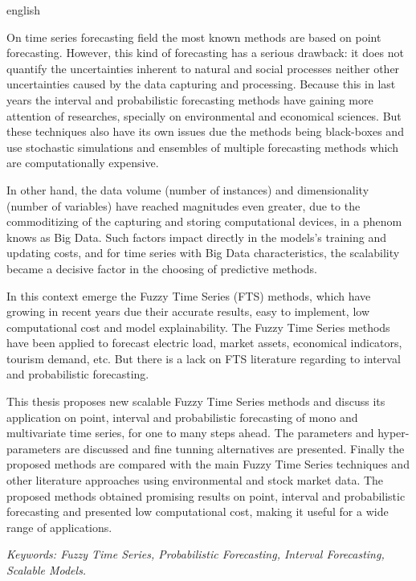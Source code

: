\begin{resumo}[Abstract]
    \begin{otherlanguage*}{english}

On time series forecasting field the most known methods are based on point forecasting. However, this kind of forecasting has a serious drawback: it does not quantify the uncertainties inherent to natural and social processes neither other uncertainties caused by the data capturing and processing. Because this in last years the interval and probabilistic forecasting methods have gaining more attention of researches, specially on environmental and economical sciences. But these techniques also have its own issues due the methods being black-boxes and use stochastic simulations and ensembles of multiple forecasting methods which are computationally expensive.

In other hand, the data volume (number of instances) and dimensionality (number of variables) have reached magnitudes even greater, due to the commoditizing of the capturing and storing computational devices, in a phenom knows as Big Data. Such factors impact directly in the models's training and updating costs, and for time series with Big Data characteristics, the scalability became a decisive factor in the choosing of predictive methods.

In this context emerge the Fuzzy Time Series (FTS) methods, which have growing in recent years due their accurate results, easy to implement, low computational cost and model explainability. The Fuzzy Time Series methods have been applied to forecast electric load, market assets, economical indicators, tourism demand, etc. But there is a lack on FTS literature regarding to interval and probabilistic forecasting.

This thesis proposes new scalable Fuzzy Time Series methods and discuss its application on point, interval and probabilistic forecasting of mono and multivariate time series, for one to many steps ahead. The parameters and hyper-parameters are discussed and fine tunning alternatives are presented. Finally the proposed methods are compared with the main Fuzzy Time Series techniques and other literature approaches using environmental and stock market data. The proposed methods obtained promising results on point, interval and probabilistic forecasting and presented low computational cost, making it useful for a wide range of applications.

\textit{Keywords: Fuzzy Time Series, Probabilistic Forecasting, Interval Forecasting, Scalable Models.}
    \end{otherlanguage*}
\end{resumo}